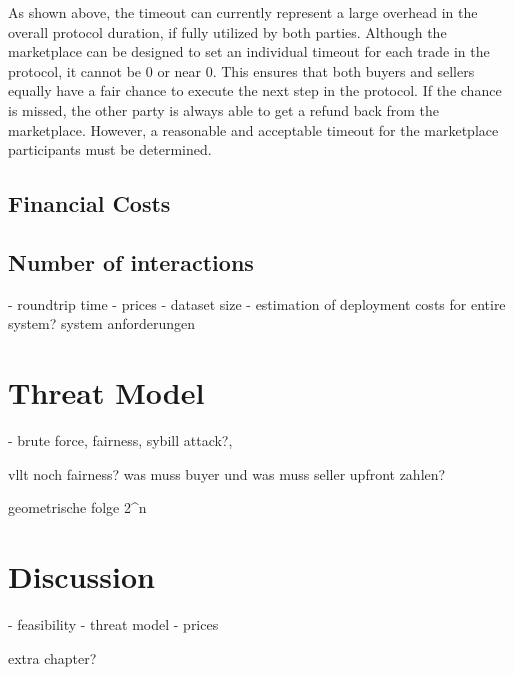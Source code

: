As shown above, the timeout can currently represent a large overhead in the overall protocol duration, if fully utilized by both parties. Although the marketplace can be designed to set an individual timeout for each trade in the protocol, it cannot be 0 or near 0. This ensures that both buyers and sellers equally have a fair chance to execute the next step in the protocol. If the chance is missed, the other party is always able to get a refund back from the marketplace. However, a reasonable and acceptable timeout for the marketplace participants must be determined.

\subsection{Financial Costs}
\label{subsec:financial}

\subsection{Number of interactions}
\label{subsec:duration}

- roundtrip time
- prices
- dataset size
- estimation of deployment costs for entire system? system anforderungen


\section{Threat Model}

- brute force, fairness, sybill attack?, 

vllt noch fairness? was muss buyer und was muss seller upfront zahlen?

geometrische folge 2^n

\section{Discussion}

- feasibility
- threat model
- prices

extra chapter?